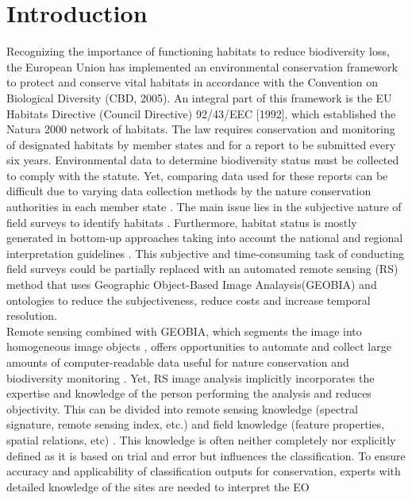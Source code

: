 \documentclass[authoryear, review,12pt,number]{elsarticle}
\begin{document}
\section{Introduction}
Recognizing the importance of functioning habitats to reduce biodiversity loss, 
the European Union has implemented an environmental conservation framework to 
protect and conserve vital habitats in accordance with the Convention on 
Biological Diversity (CBD, 2005). An integral part of this framework is the EU 
Habitats Directive (Council Directive) 92/43/EEC [1992], which established the 
Natura 2000 network of habitats. The law requires conservation and monitoring 
of designated habitats by member states and for a report to be submitted every 
six years. Environmental data to determine biodiversity status must be 
collected to comply with the statute. Yet, comparing data used for these reports 
can be difficult due to varying data collection methods by the nature 
conservation authorities in each member state \citep{INSPIREdataspecs, INSPIRE}. 
The main issue lies in the subjective nature of field surveys to identify 
habitats \citep{Cherrill1999, Cherrill1999a, Nieland2015}. Furthermore, habitat 
status is mostly generated in bottom-up approaches taking into account the 
national and regional interpretation guidelines \citep{INSPIREdataspecs}. This 
subjective and time-consuming task of conducting field surveys could be 
partially replaced with an automated remote sensing (RS) method that uses  
Geographic Object-Based Image Analaysis(GEOBIA) and ontologies to reduce the 
subjectiveness, reduce costs and increase temporal resolution.
\\
Remote sensing combined with GEOBIA, which segments the image into homogeneous 
image objects \citep{Blaschke2010}, offers opportunities to automate and 
collect large amounts of computer-readable data useful for nature conservation 
and biodiversity monitoring \citep{Corbane2015, VandenBorre2011, Mayer2011}. 
Yet, RS image analysis implicitly incorporates the expertise and knowledge of 
the person performing the analysis and reduces objectivity. This can be divided 
into remote sensing knowledge (spectral signature, remote sensing index, etc.) 
and field knowledge (feature properties, spatial relations, etc) 
\citep{Andres2013a}. This knowledge is often neither completely nor explicitly 
defined as it is based on trial and error but influences the classification. To 
ensure accuracy and applicability of classification outputs for conservation, 
experts with detailed knowledge of the sites are needed to interpret the EO 
\end{document}
